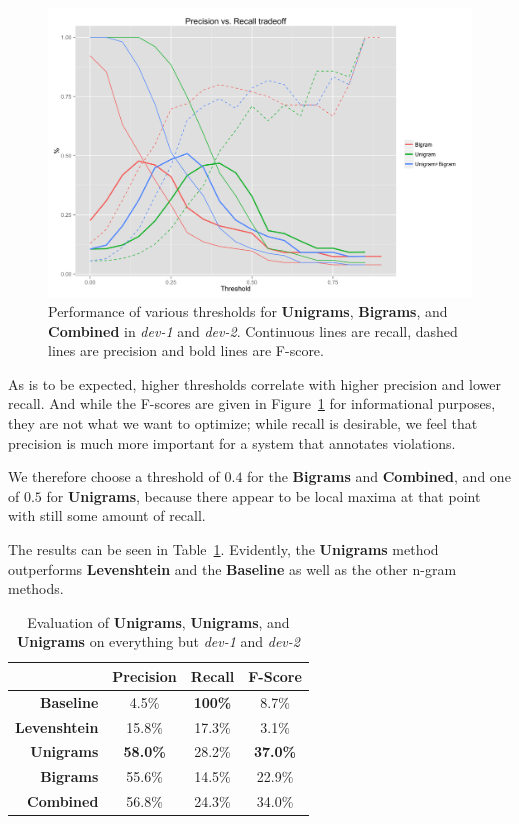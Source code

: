 \documentclass[a4paper,10pt]{scrartcl}
\theoremstyle{style}
\begin{document}
\begin{figure}
\begin{center}
\includegraphics[scale=0.15]{a.png}
\end{center}
\caption{Performance of various thresholds for \textbf{Unigrams}, \textbf{Bigrams}, and \textbf{Combined} in \textit{dev-1} and \textit{dev-2}. Continuous lines are recall, dashed lines are precision and bold lines are F-score.}
\label{redundancy_graph}
\end{figure}

As is to be expected, higher thresholds correlate with higher precision and lower recall. And while the F-scores are given in Figure~\ref{redundancy_graph} for informational purposes, they are not what we want to optimize; while recall is desirable, we feel that precision is much more important for a system that annotates violations.

We therefore choose a threshold of $0.4$ for the \textbf{Bigrams} and \textbf{Combined}, and one of $0.5$ for \textbf{Unigrams}, because there appear to be local maxima at that point with still some amount of recall.

The results can be seen in Table~\ref{eval_redundancy}. Evidently, the \textbf{Unigrams} method outperforms \textbf{Levenshtein} and the \textbf{Baseline} as well as the other n-gram methods.

\begin{table}
\begin{center}
\begin{tabular}{r|c|c|c|}
& Precision & Recall & F-Score \\
\hline
\textbf{Baseline} & 4.5\% & \textbf{100\%} & 8.7\% \\
\hline
\textbf{Levenshtein} & 15.8\% & 17.3\% & 3.1\% \\
\hline
\textbf{Unigrams} & \textbf{58.0\%} & 28.2\% & \textbf{37.0\%} \\
\hline
\textbf{Bigrams} & 55.6\% & 14.5\% & 22.9\% \\
\hline
\textbf{Combined} & 56.8\% & 24.3\% & 34.0\% \\
\hline
\end{tabular}
\end{center}
\caption{Evaluation of \textbf{Unigrams}, \textbf{Unigrams}, and \textbf{Unigrams} on everything but \textit{dev-1} and \textit{dev-2}}
\label{eval_redundancy}
\end{table}
\end{document}
